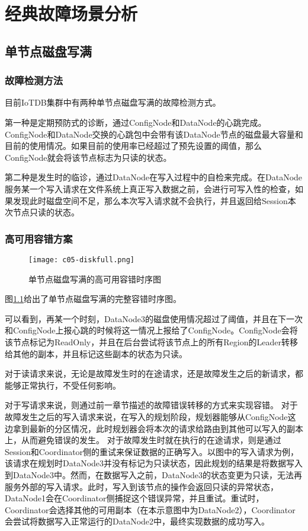 
\chapter{经典故障场景分析}

\section{单节点磁盘写满}

\subsection{故障检测方法}

目前IoTDB集群中有两种单节点磁盘写满的故障检测方式。

第一种是定期预防式的诊断，通过ConfigNode和DataNode的心跳完成。ConfigNode和DataNode交换的心跳包中会带有该DataNode节点的磁盘最大容量和目前的使用情况。如果目前的使用率已经超过了预先设置的阈值，那么ConfigNode就会将该节点标志为只读的状态。

第二种是发生时的临诊，通过DataNode在写入过程中的自检来完成。在DataNode服务某一个写入请求在文件系统上真正写入数据之前，会进行可写入性的检查，如果发现此时磁盘空间不足，那么本次写入请求就不会执行，并且返回给Session本次节点只读的状态。

\subsection{高可用容错方案}

\begin{figure}
    \centering
    \texttt{[image: c05-diskfull.png]}
    \caption{单节点磁盘写满的高可用容错时序图}
    \label{fig:c05-diskfull}
  \end{figure}

图\ref{fig:c05-diskfull}给出了单节点磁盘写满的完整容错时序图。

可以看到，再某一个时刻，DataNode3的磁盘使用情况超过了阈值，并且在下一次和ConfigNode上报心跳的时候将这一情况上报给了ConfigNode。ConfigNode会将该节点标记为ReadOnly，并且在后台尝试将该节点上的所有Region的Leader转移给其他的副本，并且标记这些副本的状态为只读。

对于读请求来说，无论是故障发生时的在途请求，还是故障发生之后的新请求，都能够正常执行，不受任何影响。

对于写请求来说，则通过前一章节描述的故障错误转移的方式来实现容错。
对于故障发生之后的写入请求来说，在写入的规划阶段，规划器能够从ConfigNode这边拿到最新的分区情况，此时规划器会将本次的请求给路由到其他可以写入的副本上，从而避免错误的发生。
对于故障发生时就在执行的在途请求，则是通过Session和Coordinator侧的重试来保证数据的正确写入。以图中的写入请求为例，该请求在规划时DataNode3并没有标记为只读状态，因此规划的结果是将数据写入到DataNode3中。然而，在数据写入之前，DataNode3的状态变更为只读，无法再服务外部的写入请求。此时，写入到该节点的操作会返回只读的异常状态，DataNode1会在Coordinator侧捕捉这个错误异常，并且重试。重试时，Coordinator会选择其他的可用副本（在本示意图中为DataNode2），Coordinator会尝试将数据写入正常运行的DataNode2中，最终实现数据的成功写入。


